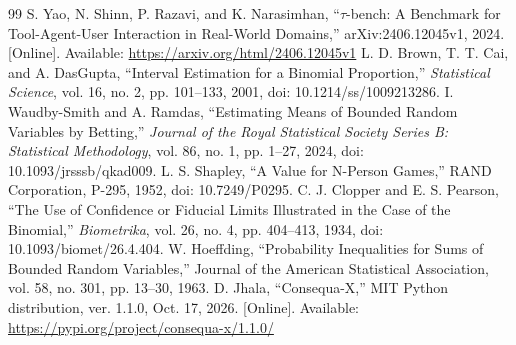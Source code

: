 \documentclass[conference]{IEEEtran}
\begin{document}
\begin{thebibliography}{99}
S. Yao, N. Shinn, P. Razavi, and K. Narasimhan, ``$\tau$-bench: A Benchmark for Tool-Agent-User Interaction in Real-World Domains,'' arXiv:2406.12045v1, 2024. [Online]. Available: \url{https://arxiv.org/html/2406.12045v1}
L. D. Brown, T. T. Cai, and A. DasGupta, ``Interval Estimation for a Binomial Proportion,'' \emph{Statistical Science}, vol. 16, no. 2, pp. 101--133, 2001, doi: 10.1214/ss/1009213286.
I. Waudby-Smith and A. Ramdas, ``Estimating Means of Bounded Random Variables by Betting,'' \emph{Journal of the Royal Statistical Society Series B: Statistical Methodology}, vol. 86, no. 1, pp. 1--27, 2024, doi: 10.1093/jrsssb/qkad009.
 L. S. Shapley, ``A Value for N-Person Games,'' RAND
Corporation, P-295, 1952, doi: 10.7249/P0295.
C. J. Clopper and E. S. Pearson, ``The Use of Confidence or Fiducial Limits Illustrated in the Case of the Binomial,'' \emph{Biometrika}, vol. 26, no. 4, pp. 404--413, 1934, doi: 10.1093/biomet/26.4.404.
 W. Hoeffding, ``Probability Inequalities for Sums of
Bounded Random Variables,'' Journal of the American Statistical Association,
vol. 58, no. 301, pp. 13--30, 1963.
 D. Jhala, ``Consequa-X,'' MIT Python distribution,
ver. 1.1.0, Oct. 17, 2026. [Online]. Available:
\url{https://pypi.org/project/consequa-x/1.1.0/}
\end{thebibliography}
\end{document}
